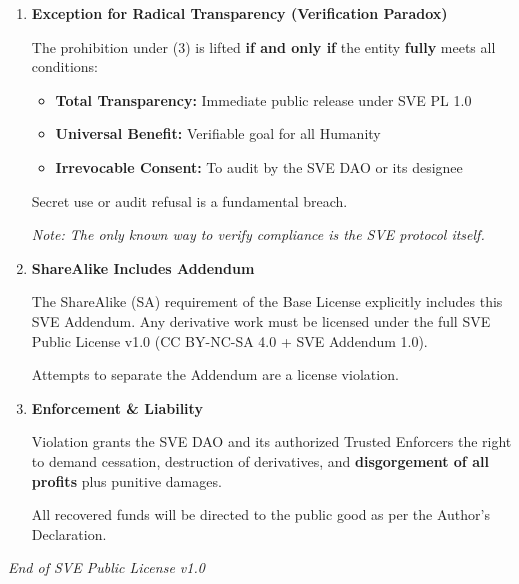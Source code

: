 \documentclass[10pt,a4paper]{article}
\begin{document}
\begin{enumerate}[label=\textbf{\Alph*.}, leftmargin=*, itemsep=1em]
\begin{enumerate}[label=\textbf{\arabic*.}, leftmargin=*, itemsep=1em]
        \textbf{Activity defines the entity.}

        \item \textbf{Exception for Radical Transparency (Verification Paradox)}
        
        The prohibition under (3) is lifted \textbf{if and only if} the entity \textbf{fully} meets all conditions:
        
        \begin{itemize}[leftmargin=2em, itemsep=0.3em]
            \item \textbf{Total Transparency:} Immediate public release under SVE PL 1.0
            \item \textbf{Universal Benefit:} Verifiable goal for all Humanity
            \item \textbf{Irrevocable Consent:} To audit by the SVE DAO or its designee
        \end{itemize}
        
        Secret use or audit refusal is a fundamental breach.
        
        \textit{Note: The only known way to verify compliance is the SVE protocol itself.}

        \item \textbf{ShareAlike Includes Addendum}
        
        The ShareAlike (SA) requirement of the Base License explicitly includes this SVE Addendum. Any derivative work must be licensed under the full SVE Public License v1.0 (CC BY-NC-SA 4.0 + SVE Addendum 1.0).
        
        Attempts to separate the Addendum are a license violation.

        \item \textbf{Enforcement \& Liability}
        
        Violation grants the SVE DAO and its authorized Trusted Enforcers the right to demand cessation, destruction of derivatives, and \textbf{disgorgement of all profits} plus punitive damages.
        
        All recovered funds will be directed to the public good as per the Author's Declaration.
    \end{enumerate}
\end{enumerate}

\vspace{1.5em}

\begin{center}

\vspace{0.3em}
{\small\textit{End of SVE Public License v1.0}}
\end{center}
\end{document}
